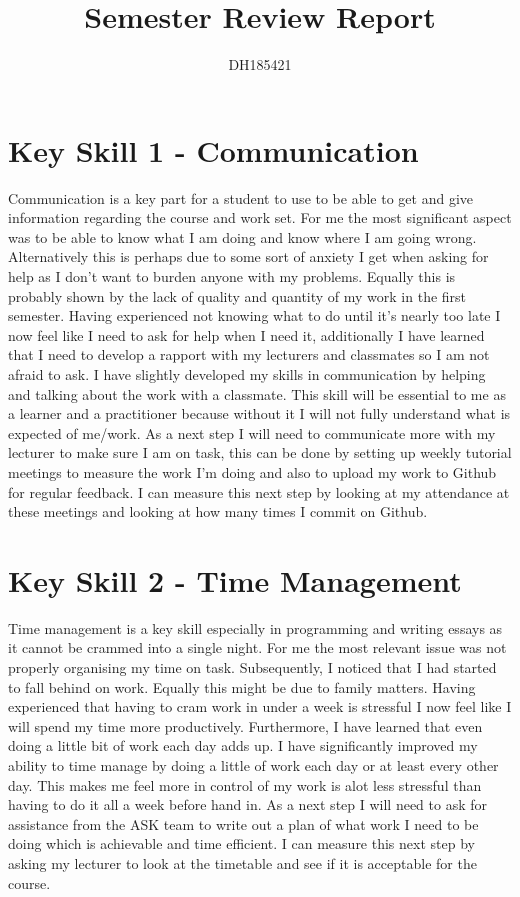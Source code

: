 \documentclass{scrartcl}
\title{Semester Review Report}
\author{DH185421}
\begin{document}
\maketitle






\section{Key Skill 1 - Communication}

Communication is a key part for a student to use to be able to get and give information regarding the course and work set. For me the most significant aspect was to be able to know what I am doing and know where I am going wrong. Alternatively this is perhaps due to some sort of anxiety I get when asking for help as I don’t want to burden anyone with my problems. Equally this is probably shown by the lack of quality and quantity of my work in the first semester. Having experienced not knowing what to do until it's nearly too late I now feel like I need to ask for help when I need it, additionally I have learned that I need to develop a rapport with my lecturers and classmates so I am not afraid to ask. I have slightly developed my skills in communication by helping and talking about the work with a classmate. This skill will be essential to me as a learner and a practitioner because without it I will not fully understand what is expected of me/work. As a next step I will need to communicate more with my lecturer to make sure I am on task, this can be done by setting up weekly tutorial meetings to measure the work I'm doing and also to upload my work to Github for regular feedback. I can measure this next step by looking at my attendance at these meetings and looking at how many times I commit on Github.

\section{Key Skill 2 - Time Management}
Time management is a key skill especially in programming and writing essays as it cannot be crammed into a single night. For me the most relevant issue was not properly organising my time on task. Subsequently, I noticed that I had started to fall behind on work. Equally this might be due to family matters. Having experienced that having to cram work in under a week is stressful I now feel like I will spend my time more productively. Furthermore, I have learned that even doing a little bit of work each day adds up. I have significantly improved my ability to time manage by doing a little of work each day or at least every other day. This makes me feel more in control of my work is alot less stressful than having to do it all a week before hand in. As a next step I will need to ask for assistance from the ASK team to write out a plan of what work I need to be doing which is achievable and time efficient. I can measure this next step by asking my lecturer to look at the timetable and see if it is acceptable for the course.
\end{document}
